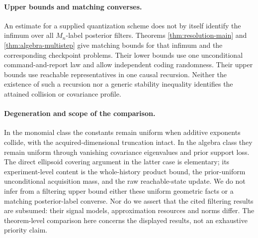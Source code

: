 \paragraph{Upper bounds and matching converses.}
An estimate for a supplied quantization scheme does not by itself
identify the infimum over all $M_n$-label posterior filters. Theorems
\ref{thm:resolution-main} and \ref{thm:algebra-multistep} give matching
bounds for that infimum and the corresponding checkpoint problems.
Their lower bounds use one unconditional command-and-report law and
allow independent coding randomness. Their upper bounds use reachable
representatives in one causal recursion. Neither the existence of such
a recursion nor a generic stability inequality identifies the attained
collision or covariance profile.

\paragraph{Degeneration and scope of the comparison.}
In the monomial class the constants remain uniform when additive
exponents collide, with the acquired-dimensional truncation intact.
In the algebra class they remain uniform through vanishing covariance
eigenvalues and prior support loss. The direct ellipsoid covering
argument in the latter case is elementary; its experiment-level content
is the whole-history product bound, the prior-uniform unconditional
acquisition mass, and the raw reachable-state update. We do not infer
from a filtering upper bound either these uniform geometric facts or a
matching posterior-label converse. Nor do we assert that the cited
filtering results are subsumed: their signal models, approximation
resources and norms differ. The theorem-level comparison here concerns
the displayed results, not an exhaustive priority claim.
